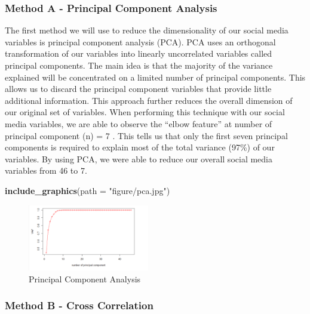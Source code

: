 \documentclass[12pt,oneside]{chicagocapstone}
\newenvironment{Shaded}{\begin{snugshade}}{\end{snugshade}}
\newcommand{\KeywordTok}[1]{\textcolor[rgb]{0.13,0.29,0.53}{\textbf{#1}}}
\newcommand{\DataTypeTok}[1]{\textcolor[rgb]{0.13,0.29,0.53}{#1}}
\newcommand{\StringTok}[1]{\textcolor[rgb]{0.31,0.60,0.02}{#1}}
\newcommand{\NormalTok}[1]{#1}
\begin{document}
\subsubsection*{Method A - Principal Component
Analysis}\label{method-a---principal-component-analysis}

The first method we will use to reduce the dimensionality of our social
media variables is principal component analysis (PCA). PCA uses an
orthogonal transformation of our variables into linearly uncorrelated
variables called principal components. The main idea is that the
majority of the variance explained will be concentrated on a limited
number of principal components. This allows us to discard the principal
component variables that provide little additional information. This
approach further reduces the overall dimension of our original set of
variables. When performing this technique with our social media
variables, we are able to observe the ``elbow feature'' at number of
principal component (n) = 7 . This tells us that only the first seven
principal components is required to explain most of the total variance
(97\%) of our variables. By using PCA, we were able to reduce our
overall social media variables from 46 to 7.
\begin{Shaded}
\begin{Highlighting}[]
\KeywordTok{include_graphics}\NormalTok{(}\DataTypeTok{path =} \StringTok{"figure/pca.jpg"}\NormalTok{)}
\end{Highlighting}
\end{Shaded}
\begin{figure}

{\centering \includegraphics[width=200px]{figure/pca} 

}

\caption{Principal Component Analysis}\label{fig:pca}
\end{figure}
\subsubsection*{Method B - Cross
Correlation}\label{method-b---cross-correlation}
\end{document}
